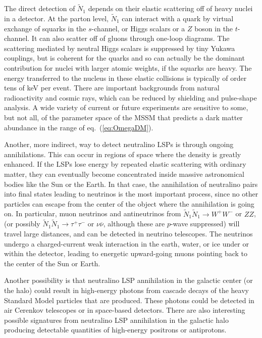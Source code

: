 \documentclass[11pt]{article}
\def\stilde{\widetilde}
\def\NI{\stilde N_1}
\begin{document}
The direct detection of $\NI$ depends on their elastic scattering off of 
heavy nuclei in a detector. At the parton level, $\NI$ can interact with a 
quark by virtual exchange of squarks in the $s$-channel, or Higgs scalars 
or a $Z$ boson in the $t$-channel. It can also scatter off of gluons 
through one-loop diagrams. The scattering mediated by neutral Higgs 
scalars is suppressed by tiny Yukawa couplings, but is coherent for the 
quarks and so can actually be the dominant contribution for nuclei with 
larger atomic weights, if the squarks are heavy. The energy transferred to 
the nucleus in these elastic collisions is typically of order tens of keV 
per event. There are important backgrounds from natural radioactivity and 
cosmic rays, which can be reduced by shielding and pulse-shape analysis. A 
wide variety of current or future experiments are sensitive to some, but 
not all, of the parameter space of the MSSM that predicts a dark matter 
abundance in the range of eq.~(\ref{eq:OmegaDM}).

Another, more indirect, way to detect neutralino LSPs is through ongoing 
annihilations. This can occur in regions of space where the density is 
greatly enhanced. If the LSPs lose energy by repeated elastic scattering 
with ordinary matter, they can eventually become concentrated inside 
massive astronomical bodies like the Sun or the Earth. In that case, the 
annihilation of neutralino pairs into final states leading to neutrinos is 
the most important process, since no other particles can escape from the 
center of the object where the annihilation is going on. In particular, 
muon neutrinos and antineutrinos from $\NI\NI \rightarrow W^+ W^-$ or 
$ZZ$, (or possibly $\NI\NI \rightarrow \tau^+ \tau^-$ or 
$\nu\overline\nu$, although these are $p$-wave suppressed) will travel 
large distances, and can be detected in neutrino telescopes. The neutrinos 
undergo a charged-current weak interaction in the earth, water, or ice 
under or within the detector, leading to energetic upward-going muons 
pointing back to the center of the Sun or Earth.

Another possibility is that neutralino LSP annihilation in the galactic 
center (or the halo) could result in high-energy photons from cascade 
decays of the heavy Standard Model particles that are produced.  These 
photons could be detected in air Cerenkov telescopes or in space-based 
detectors. There are also interesting possible signatures from neutralino 
LSP annihilation in the galactic halo producing detectable quantities of 
high-energy positrons or antiprotons.
\end{document}
